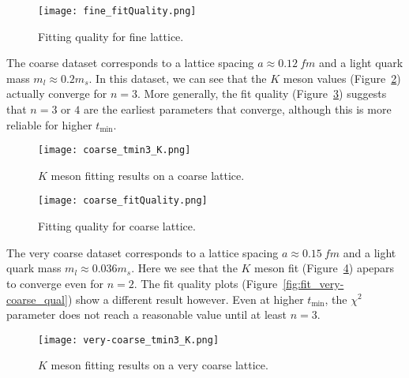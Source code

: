 \documentclass[a4paper,12pt]{article}
\begin{document}
\begin{figure}[p]
    \centering
    \texttt{[image: fine\_fitQuality.png]}
    \caption{Fitting quality for fine lattice.\label{fig:fit_fine_qual}}
\end{figure}

\bigskip
The coarse dataset corresponds to a lattice spacing $a \approx \SI{0.12}{fm}$ and a light quark mass $m_l \approx 0.2 m_s$. In this dataset, we can see that the $K$ meson values (Figure~\ref{fig:fit_coarse_K}) actually converge for $n=3$. More generally, the fit quality (Figure~\ref{fig:fit_coarse_qual}) suggests that $n = 3$ or $4$ are the earliest parameters that converge, although this is more reliable for higher $t_\mathrm{min}$.

\begin{figure}[p]
    \centering
    \texttt{[image: coarse\_tmin3\_K.png]}
    \caption{$K$ meson fitting results on a coarse lattice.\label{fig:fit_coarse_K}}
\end{figure}

\begin{figure}[p]
    \centering
    \texttt{[image: coarse\_fitQuality.png]}
    \caption{Fitting quality for coarse lattice.\label{fig:fit_coarse_qual}}
\end{figure}

\bigskip
The very coarse dataset corresponds to a lattice spacing $a \approx \SI{0.15}{fm}$ and a light quark mass $m_l \approx 0.036m_s$. Here we see that the $K$ meson fit (Figure~\ref{fig:fit_very-coarse_K}) apepars to converge even for $n=2$. The fit quality plots (Figure~\ref{fig:fit_very-coarse_qual}) show a different result however. Even at higher $t_\mathrm{min}$, the $\chi^2$ parameter does not reach a reasonable value until at least $n=3$.

\begin{figure}[p]
    \centering
    \texttt{[image: very-coarse\_tmin3\_K.png]}
    \caption{$K$ meson fitting results on a very coarse lattice.\label{fig:fit_very-coarse_K}}
\end{figure}
\end{document}
